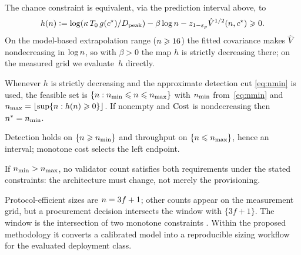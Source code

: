 The chance constraint is equivalent, via the prediction interval above, to
\begin{equation}
h(\n)\eqdef\log(\kappaScale\,\Tzero\,\gfun(\cc^{\star})/\Dpk)
-\beta\log\n-\zq_{1-\epsp}\hat{V}^{1/2}(\n,\cc^{\star})\ge0.
\label{eq:h}
\end{equation}
On the model-based extrapolation range ($n\geqslant16$) the fitted
covariance makes $\hat{V}$ nondecreasing in $\log n$, so with
$\beta>0$ the map $h$ is strictly decreasing there; on the measured grid we
evaluate~$h$ directly.

\begin{Proposition}
\label{prop:window}
Whenever $h$ is strictly decreasing and the approximate detection cut
\eqref{eq:nmin} is used, the feasible set is
$\{\n:\nmin\le\n\le\nmax\}$ with $\nmin$ from~\eqref{eq:nmin} and
$\nmax=\lfloor\sup\{\n:h(\n)\ge0\}\rfloor$. If nonempty and $\mathrm{Cost}$ is
nondecreasing then $\nopt=\nmin$.
\end{Proposition}

\begin{Proof}
Detection holds on $\{\n\ge\nmin\}$ and throughput on $\{\n\le\nmax\}$, hence an
interval; monotone cost selects the left endpoint.
\end{Proof}

\begin{Corollary}
\label{cor:infeasible}
If $\nmin>\nmax$, no validator count satisfies both requirements under the
stated constraints: the architecture must change, not merely the provisioning.
\end{Corollary}

Protocol-efficient sizes are $n=3f+1$; other counts appear on the measurement
grid, but a procurement decision intersects the window with $\{3f+1\}$. The
window is the intersection of two monotone constraints
\cite{charnes1959,nemirovski2007}. Within the proposed methodology it converts
a calibrated model into a reproducible sizing workflow for the evaluated
deployment class.
